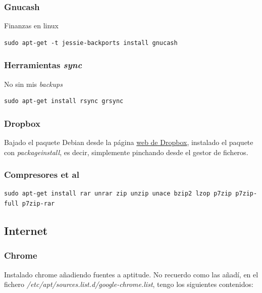 \documentclass[12pt,spanish,]{article}
\begin{document}
\subsubsection{Gnucash}\label{gnucash}

Finanzas en linux

\begin{verbatim}
sudo apt-get -t jessie-backports install gnucash
\end{verbatim}

\subsubsection{\texorpdfstring{Herramientas
\emph{sync}}{Herramientas sync}}\label{herramientas-sync}

No sin mis \emph{backups}

\begin{verbatim}
sudo apt-get install rsync grsync
\end{verbatim}

\subsubsection{Dropbox}\label{dropbox}

Bajado el paquete Debian desde la página
\href{https://www.dropbox.com/install-linux}{web de Dropbox}, instalado
el paquete con \emph{packageinstall}, es decir, simplemente pinchando
desde el gestor de ficheros.

\subsubsection{Compresores et al}\label{compresores-et-al}

\begin{verbatim}
sudo apt-get install rar unrar zip unzip unace bzip2 lzop p7zip p7zip-full p7zip-rar
\end{verbatim}

\subsection{Internet}\label{internet}

\subsubsection{Chrome}\label{chrome}

Instalado chrome añadiendo fuentes a aptitude. No recuerdo como las
añadí, en el fichero \emph{/etc/apt/sources.list.d/google-chrome.list},
tengo los siguientes contenidos:
\end{document}
